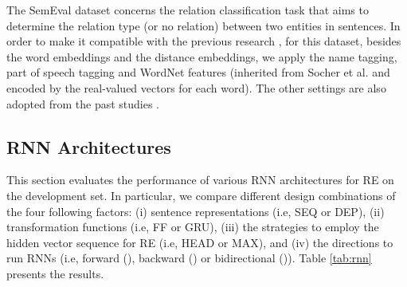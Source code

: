 \documentclass[11pt,letterpaper]{article}
\begin{document}
The SemEval dataset concerns the relation classification task that aims to determine the relation type (or no relation) between two entities in sentences. In order to make it compatible with the previous research \cite{Socher:12,Gormley:15}, for this dataset, besides the word embeddings and the distance embeddings, we apply the name tagging, part of speech tagging and WordNet features (inherited from Socher et al.  and encoded by the real-valued vectors for each word). The other settings are also adopted from the past studies \cite{Socher:12,Xu:15}.





\subsection{RNN Architectures}

This section evaluates the performance of various RNN architectures for RE on the development set. In particular, we compare different design combinations of the four following factors: (i) sentence representations (i.e, SEQ or DEP), (ii) transformation functions  (i.e, FF or GRU), (iii) the strategies to employ the hidden vector sequence for RE (i.e, HEAD or MAX), and (iv) the directions to run RNNs (i.e, forward (), backward () or bidirectional ()). Table \ref{tab:rnn} presents the results.
\end{document}
